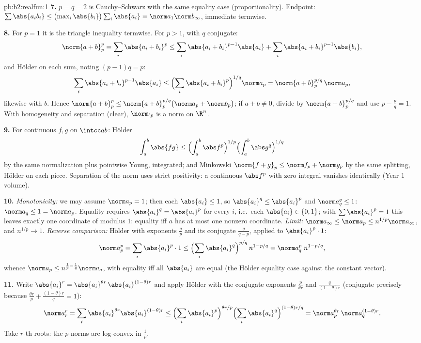 \begin{solution}{pb:b2:realfun:1}
\textbf{7.} $p = q = 2$ is Cauchy--Schwarz with the same
equality case (proportionality). Endpoint: $\sum\abs{a_ib_i}
\leq \bigl(\max_i\abs{b_i}\bigr)\sum_i\abs{a_i} =
\norm a_1\norm b_\infty$, immediate termwise.

\textbf{8.} For $p = 1$ it is the triangle inequality termwise.
For $p > 1$, with $q$ conjugate:
\[
\norm{a+b}_p^p = \sum_i\abs{a_i + b_i}^p
\leq \sum_i\abs{a_i+b_i}^{p-1}\abs{a_i} +
\sum_i\abs{a_i+b_i}^{p-1}\abs{b_i},
\]
and H\"older on each sum, noting $(p - 1)q = p$:
\[
\sum_i\abs{a_i+b_i}^{p-1}\abs{a_i} \leq
\Bigl(\sum_i\abs{a_i+b_i}^{p}\Bigr)^{1/q}\norm a_p
= \norm{a + b}_p^{p/q}\,\norm a_p ,
\]
likewise with $b$. Hence $\norm{a+b}_p^p \leq \norm{a +
b}_p^{p/q}\bigl(\norm a_p + \norm b_p\bigr)$; if $a + b \neq 0$,
divide by $\norm{a+b}_p^{p/q}$ and use $p - \frac pq = 1$. With
homogeneity and separation (clear), $\norm\cdot_p$ is a norm on
$\R^n$.

\textbf{9.} For continuous $f, g$ on $\intcc ab$: H\"older
\[
\int_a^b\abs{fg} \leq \Bigl(\int_a^b\abs
f^p\Bigr)^{1/p}\Bigl(\int_a^b\abs g^q\Bigr)^{1/q}
\]
by the same normalization plus pointwise Young, integrated; and
Minkowski $\norm{f + g}_p \leq \norm f_p + \norm g_p$ by the
same splitting, H\"older on each piece. Separation of the norm
uses strict positivity: a continuous $\abs f^p$ with zero
integral vanishes identically (Year 1 volume).

\textbf{10.} \emph{Monotonicity:} we may assume $\norm a_p = 1$;
then each $\abs{a_i} \leq 1$, so $\abs{a_i}^q \leq \abs{a_i}^p$
and $\norm a_q^q \leq 1$: $\norm a_q \leq 1 = \norm a_p$.
Equality requires $\abs{a_i}^q = \abs{a_i}^p$ for every $i$,
i.e.\ each $\abs{a_i} \in \{0, 1\}$; with $\sum\abs{a_i}^p = 1$
this leaves exactly one coordinate of modulus $1$: equality iff
$a$ has at most one nonzero coordinate. \emph{Limit:} $\norm a_\infty \leq
\norm a_p \leq n^{1/p}\norm a_\infty$, and $n^{1/p} \to 1$.
\emph{Reverse comparison:} H\"older with exponents $\frac
qp$ and its conjugate $\frac{q}{q-p}$, applied to
$\abs{a_i}^p\cdot 1$:
\[
\norm a_p^p = \sum_i\abs{a_i}^p\cdot 1 \leq
\Bigl(\sum_i\abs{a_i}^{q}\Bigr)^{p/q}\,n^{1 - p/q}
= \norm a_q^{p}\; n^{1-p/q},
\]
whence $\norm a_p \leq n^{\frac1p - \frac1q}\norm a_q$, with
equality iff all $\abs{a_i}$ are equal (the H\"older equality
case against the constant vector).

\textbf{11.} Write $\abs{a_i}^r = \abs{a_i}^{\theta
r}\,\abs{a_i}^{(1-\theta)r}$ and apply H\"older with the
conjugate exponents $\frac{p}{\theta r}$ and
$\frac{q}{(1-\theta)r}$ (conjugate precisely because $\frac{\theta
r}p + \frac{(1-\theta)r}q = 1$):
\[
\norm a_r^r = \sum_i \abs{a_i}^{\theta r}\abs{a_i}^{(1-\theta)r}
\leq \Bigl(\sum_i\abs{a_i}^{p}\Bigr)^{\theta r/p}
\Bigl(\sum_i\abs{a_i}^{q}\Bigr)^{(1-\theta)r/q}
= \norm a_p^{\theta r}\,\norm a_q^{(1-\theta)r} .
\]
Take $r$-th roots: the $p$-norms are log-convex in $\frac1p$.


\end{solution}
